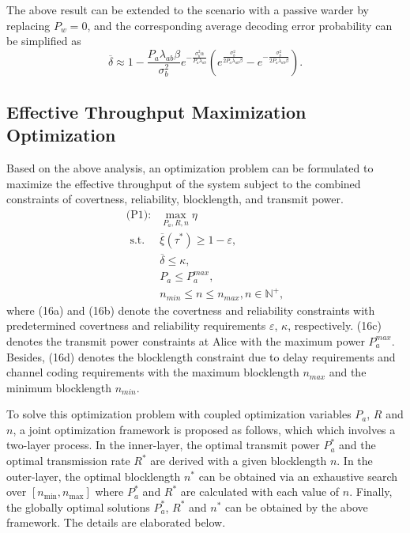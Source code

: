 \documentclass[conference]{IEEEtran}
\begin{document}
The above result can be extended to the scenario with a passive warder by replacing $P_w=0$, and the corresponding average decoding error probability can be simplified as
\begin{equation}
	\overline \delta \approx 1 - \frac{{{P_a}{\lambda _{ab}}\beta }}{{\sigma _b^2}}{e^{ - \frac{{\sigma _b^2\alpha }}{{{P_a}{\lambda _{ab}}}}}}\left( {{e^{\frac{{\sigma _b^2}}{{2{P_a}{\lambda _{ab}}\beta }}}} - {e^{ - \frac{{\sigma _b^2}}{{2{P_a}{\lambda _{ab}}\beta }}}}} \right).
\end{equation}

\subsection{Effective Throughput Maximization Optimization}
Based on the above analysis, an optimization problem can be formulated to maximize the effective throughput of the system subject to the combined constraints of covertness, reliability, blocklength, and transmit power.
\begin{align} 
	\text{(P1)}:&\max_{P_a,R,n}  \eta\\
	\text { s.t. } &\overline \xi  \left( {{\tau ^*}} \right)\ge 1-\varepsilon, \tag{16a} \label{con1}\\
	&\overline \delta  \le \kappa , \tag{16b} \label{con2}\\
	& P_a \le P_a^{max}, \tag{16c} \label{con3}\\
	& n_{min} \le n \le n_{max}, n\in \mathbb{N}^+, \tag{16d} \label{con4}
\end{align}
where (16a) and (16b) denote the covertness and reliability constraints with predetermined covertness and reliability requirements $\varepsilon$, $\kappa$, respectively. (16c) denotes the transmit power constraints at Alice with the maximum power $P_a^{max}$. Besides, (16d) denotes the blocklength constraint due to delay requirements and channel coding requirements with the maximum blocklength $n_{max}$ and the minimum blocklength $n_{min}$.

To solve this optimization problem with coupled optimization variables $P_a$, $R$ and $n$, a joint optimization framework is proposed as follows, which which involves a two-layer process. In the inner-layer, the optimal transmit power $P_a^*$ and the optimal transmission rate $R^*$ are derived with a given blocklength $n$. In the outer-layer, the optimal blocklength $n^*$ can be obtained via an exhaustive search over $\left[ {{n_{\min }},{n_{\max }}} \right]$ where $P_a^*$ and $R^*$ are calculated with each value of $n$. Finally, the globally optimal solutions $P_a^*$, $R^*$ and $n^*$ can be obtained by the above framework. The details are elaborated below.
\end{document}
